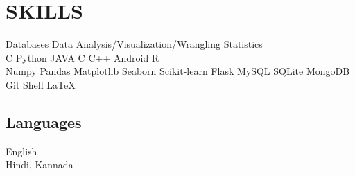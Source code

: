 \documentclass[]{deedy-resume-openfont}
\begin{document}
\section{SKILLS}
\begin{minipage}[t]{.6\textwidth}
Databases \textbullet{}    Data Analysis/Visualization/Wrangling \textbullet{} Statistics \\ 
C \textbullet{} Python \textbullet{} JAVA \textbullet{} C \textbullet{} C++ \textbullet{} Android \textbullet{} R \\
Numpy\textbullet{} Pandas\textbullet{} Matplotlib\textbullet{} Seaborn \textbullet{} Scikit-learn \textbullet{} Flask\textbullet{} MySQL\textbullet{} SQLite \textbullet{} MongoDB \textbullet{} Git\textbullet{} Shell \textbullet{} \LaTeX\
\sectionsep
\end{minipage}
\hfill
\begin{minipage}[t]{.35\textwidth}
\subsection{Languages}
 English\\
Hindi, Kannada 
\end{minipage}
\end{document}
